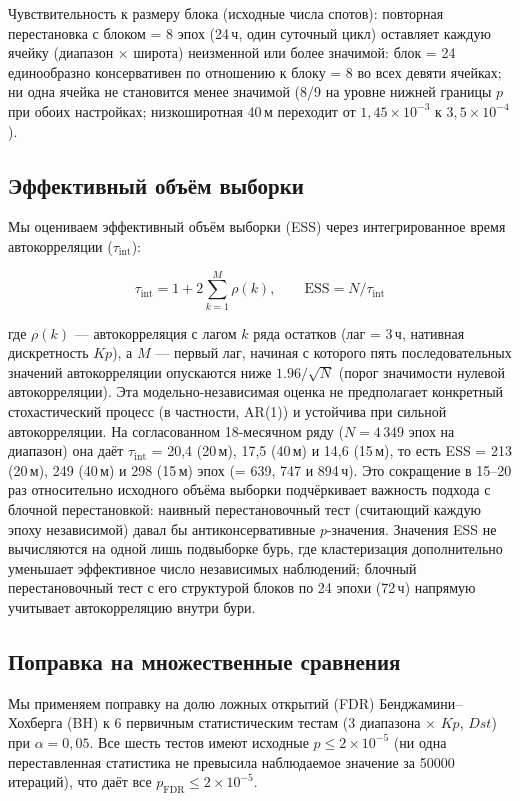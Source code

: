 \documentclass{agujournal2019}
\begin{document}
Чувствительность к размеру блока (исходные числа спотов): повторная перестановка с блоком
= 8 эпох (24\,ч, один суточный цикл) оставляет каждую ячейку
(диапазон $\times$ широта) неизменной или более значимой: блок = 24
единообразно консервативен по отношению к блоку = 8 во всех
девяти ячейках; ни одна ячейка не становится менее значимой
(8/9 на уровне нижней границы $p$ при обоих настройках;
низкоширотная 40\,м переходит от $1{,}45 \times 10^{-3}$ к $3{,}5 \times 10^{-4}$).

\subsection{Эффективный объём выборки}

Мы оцениваем эффективный объём выборки (ESS) через интегрированное
время автокорреляции ($\tau_{\text{int}}$):

\begin{equation}
	\tau_{\text{int}} = 1 + 2 \sum_{k=1}^{M} \rho(k), \qquad
	\text{ESS} = N / \tau_{\text{int}}
	\label{eq:ess}
\end{equation}

где $\rho(k)$ — автокорреляция с лагом $k$ ряда остатков (лаг = 3\,ч,
нативная дискретность $Kp$), а $M$ — первый лаг, начиная с которого
пять последовательных значений автокорреляции опускаются ниже
$1.96/\sqrt{N}$ (порог значимости нулевой автокорреляции). Эта
модельно-независимая оценка не предполагает конкретный стохастический
процесс (в частности, AR(1)) и устойчива при сильной автокорреляции.
На согласованном 18-месячном ряду ($N = 4\,349$ эпох на диапазон) она
даёт $\tau_{\text{int}}$ = 20,4 (20\,м), 17,5 (40\,м) и 14,6 (15\,м),
то есть ESS = 213 (20\,м), 249 (40\,м) и 298 (15\,м) эпох
(= 639, 747 и 894\,ч). Это сокращение в 15--20 раз относительно исходного
объёма выборки подчёркивает важность подхода с блочной
перестановкой: наивный перестановочный тест (считающий каждую эпоху
независимой) давал бы антиконсервативные $p$-значения. Значения ESS
не вычисляются на одной лишь подвыборке бурь, где кластеризация дополнительно
уменьшает эффективное число независимых наблюдений; блочный
перестановочный тест с его структурой блоков по 24 эпохи (72\,ч)
напрямую учитывает автокорреляцию внутри бури.

\subsection{Поправка на множественные сравнения}

Мы применяем поправку на долю ложных открытий (FDR)
Бенджамини--Хохберга (BH) \citep{benjamini1995} к 6 первичным
статистическим тестам (3 диапазона $\times$ {$Kp$, $Dst$}) при
$\alpha = 0{,}05$. Все шесть тестов имеют исходные
$p \le 2 \times 10^{-5}$ (ни одна переставленная статистика не превысила
наблюдаемое значение за \num{50000} итераций), что даёт все
$p_{\text{FDR}} \le 2 \times 10^{-5}$.
\end{document}
